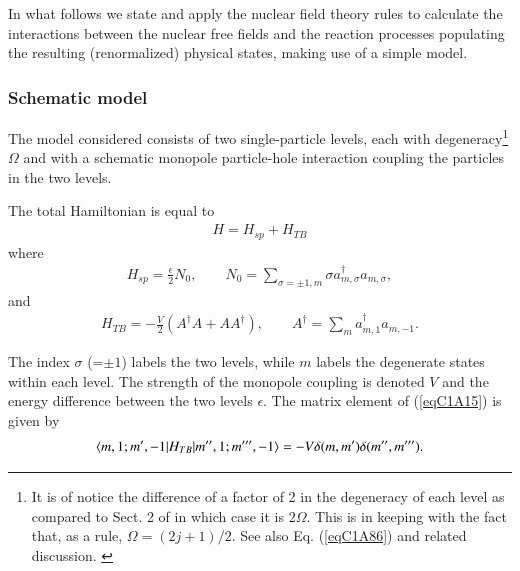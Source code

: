 In what follows we state and apply the nuclear field theory rules to calculate the interactions between the nuclear free fields and the reaction processes populating
 the resulting (renormalized) physical states, making use of a simple model.
  \subsubsection{Schematic model}
The model considered consists of two single-particle levels, each with  degeneracy\footnote{It is of notice the difference of a factor of 2 in the degeneracy of each level as compared to Sect. 2 of \cite{Bortignon:77} in which case it is $2\Omega$. This is in keeping with the fact that, as a rule, $\Omega=(2j+1)/2$. See also Eq. (\ref{eqC1A86}) and related discussion. \label{fnlabel}} $\Omega$ and with a schematic monopole particle-hole interaction coupling the particles in the two levels.

The total Hamiltonian is equal to
\begin{align}\label{eqC1A13} 
H=H_{sp}+H_{TB}
\end{align}
where
\begin{align}\label{eqC1A14} 
H_{sp}=\frac{\epsilon}{2}N_0,\quad\quad N_0=\sum_{\sigma=\pm 1,m}\sigma a^{\dagger}_{m,\sigma}a_{m,\sigma},
\end{align}
and
\begin{align}\label{eqC1A15} 
H_{TB}=-\frac{V}{2}\left(A^\dagger A+AA^\dagger\right),\quad\quad A^\dagger=\sum_m a^\dagger_{m,1}a_{m,-1}.
\end{align}


The index $\sigma$ (=$\pm1$) labels the two levels, while $m$ labels the degenerate states within
each level. The strength of the monopole coupling is denoted  $V$ and the
energy difference between the two levels  $\epsilon$. 
The matrix element of (\ref{eqC1A15}) is given by
\begin{align}\label{eqC1A16} 
\langle {m,1;m',-1|H_{TB}|m'',1;m''',-1} \rangle=-V\delta(m,m')\delta(m'',m''').
\end{align}
